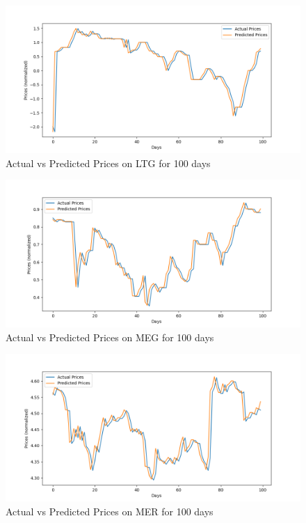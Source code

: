 \begin{figure}[ht]
    \centering
    \includegraphics[width=1\textwidth]{./assets/Chapter_4/DMD_LSTM_crossval/100days/LTG.png}
    \caption{Actual vs Predicted Prices on LTG for 100 days}
    \label{fig:crossval100_LTG}
\end{figure}
\FloatBarrier

\begin{figure}[ht]
    \centering
    \includegraphics[width=1\textwidth]{./assets/Chapter_4/DMD_LSTM_crossval/100days/MEG.png}
    \caption{Actual vs Predicted Prices on MEG for 100 days}
    \label{fig:crossval100_MEG}
\end{figure}
\FloatBarrier

\begin{figure}[ht]
    \centering
    \includegraphics[width=1\textwidth]{./assets/Chapter_4/DMD_LSTM_crossval/100days/MER.png}
    \caption{Actual vs Predicted Prices on MER for 100 days}
    \label{fig:crossval100_MER}
\end{figure}
\FloatBarrier

